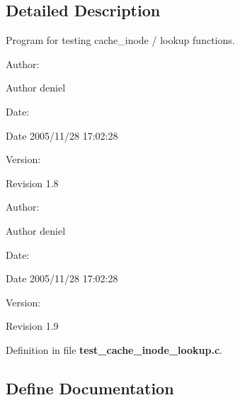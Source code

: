 \subsection{Detailed Description}
Program for testing cache\_\-inode / lookup functions. 

\begin{Desc}
\item[Author:]\end{Desc}
\begin{Desc}
\item[Author]deniel \end{Desc}
\begin{Desc}
\item[Date:]\end{Desc}
\begin{Desc}
\item[Date]2005/11/28 17:02:28 \end{Desc}
\begin{Desc}
\item[Version:]\end{Desc}
\begin{Desc}
\item[Revision]1.8 \end{Desc}


\begin{Desc}
\item[Author:]\end{Desc}
\begin{Desc}
\item[Author]deniel \end{Desc}
\begin{Desc}
\item[Date:]\end{Desc}
\begin{Desc}
\item[Date]2005/11/28 17:02:28 \end{Desc}
\begin{Desc}
\item[Version:]\end{Desc}
\begin{Desc}
\item[Revision]1.9 \end{Desc}


Definition in file {\bf test\_\-cache\_\-inode\_\-lookup.c}.

\subsection{Define Documentation}
